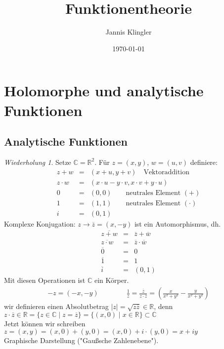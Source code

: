 \documentclass[11pt,titlepage]{article}
\title{Funktionentheorie}
\author{Jannis Klingler}
\date{\today}
\theoremstyle{definition}
\theoremstyle{remark}
\newtheorem*{repetition}{Wiederholung}
\begin{document}
\maketitle

\section{Holomorphe und analytische Funktionen}

	\subsection{Analytische Funktionen}
	
	\begin{repetition}
		Setze $\mathbb{C}=\mathbb{R}^2$. Für $z=(x,y)$, $w=(u,v)$ definiere:
		\begin{eqnarray*}
			z+w&=&(x+u,y+v) \quad\text{Vektoraddition} \\
			z\cdot w&=&(x\cdot u-y\cdot v,x\cdot v+y\cdot u) \\
			0&=&(0,0) \qquad\text{neutrales Element $(+)$}\\
			1&=&(1,1) \qquad\text{neutrales Element $(\cdot )$}\\
			i&=&(0,1)
		\end{eqnarray*}
		Komplexe Konjugation: $z\to \overline{z} =(x,-y)$ ist ein Automorphismus, dh.
		\begin{eqnarray*}
			\overline{z+w} &=& \overline{z} +\overline{w} \\
			\overline{z\cdot w} &=& \overline{z} \cdot \overline{w} \\
			\overline{0} &=& 0\\
			\overline{1} &=& 1 \\
			\overline{i} &=& (0,1)
		\end{eqnarray*}
		Mit diesen Operationen ist $\mathbb{C}$ ein Körper.
		\begin{eqnarray*}
			-z=(-x,-y) \qquad \qquad \frac{1}{z}=\frac{\overline{z}}{z\cdot \overline{z}}=\left(
			\frac{x}{x^2 +y^2}-\frac{y}{x^2 +y^2} \right)
		\end{eqnarray*}
		wir definieren einen Absolutbetrag $|z| = \sqrt{z\overline{z}}\in \mathbb{R}$, denn 
		$z\cdot\overline{z} \in \mathbb{R} =\{ z\in \mathbb{C} \mid z=\overline{z} \} =
		\{ (x,0)\mid x\in\mathbb{R} \} \subset \mathbb{C}$ \\
		Jetzt können wir schreiben $z=(x,y)=(x,0)+(y,0)=(x,0)+i\cdot (y,0)=x+iy$ \\
		Graphische Darstellung ("Gaußsche Zahlenebene").
	\end{repetition}
	
\end{document}
